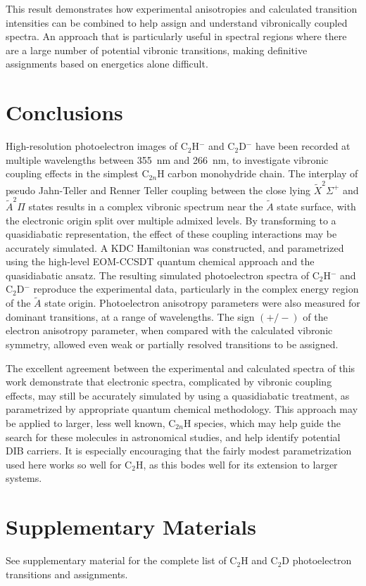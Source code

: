 \documentclass[aip,graphicx]{revtex4-1}
\begin{document}
This result demonstrates how experimental anisotropies and calculated transition intensities can be combined to help assign and understand vibronically coupled spectra. An approach that is particularly useful in spectral regions where there are a large number of potential vibronic transitions, making definitive assignments based on energetics alone difficult.



\section{Conclusions} 
High-resolution photoelectron images of C$_2$H$^-$ and C$_2$D$^-$ have been recorded at multiple wavelengths between 355~nm and 266~nm, to investigate vibronic coupling effects in the simplest C$_{2n}$H carbon monohydride chain. The interplay of pseudo Jahn-Teller and Renner Teller coupling between the close lying $\tilde{X}^2\Sigma^+$ and $\tilde{A}^2\Pi$ states results in a complex vibronic spectrum near the $\tilde{A}$ state surface, with the electronic origin split over multiple admixed levels. By transforming to a quasidiabatic representation, the effect of these coupling interactions may be accurately simulated. A KDC Hamiltonian was constructed, and parametrized using the high-level EOM-CCSDT quantum chemical approach and the quasidiabatic ansatz. The resulting simulated photoelectron spectra of C$_2$H$^-$ and C$_2$D$^-$ reproduce the experimental data, particularly in the complex energy region of the $\tilde{A}$ state origin. Photoelectron anisotropy parameters were also measured for dominant transitions, at a range of wavelengths. The sign $(+/-)$ of the electron anisotropy parameter, when compared with the calculated vibronic symmetry, allowed even weak or partially resolved transitions to be assigned.

The excellent agreement between the experimental and calculated spectra of this work
demonstrate that electronic spectra, complicated by vibronic coupling effects, may still be accurately simulated by using a quasidiabatic treatment, as parametrized by appropriate quantum chemical methodology. This approach may be applied to larger, less well known, C$_{2n}$H species, which may help guide the search for these molecules in astronomical studies, and help identify potential DIB carriers. It is especially encouraging that the fairly modest parametrization used here works so well for C$_2$H, as this bodes well for its extension to larger systems.


\section*{Supplementary Materials}
See supplementary material for the complete list of C$_2$H and C$_2$D photoelectron transitions and assignments.
\end{document}

